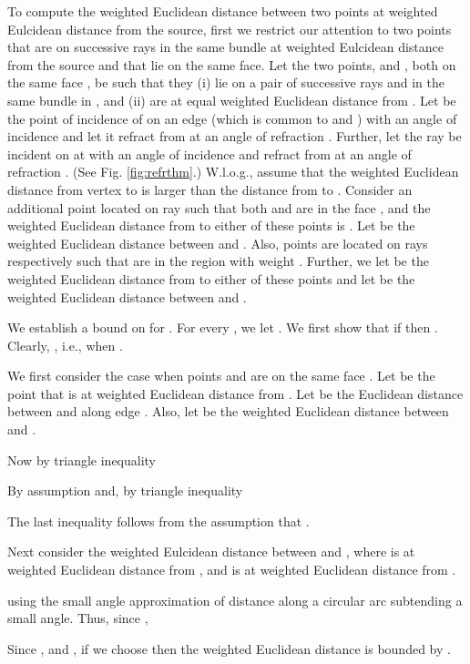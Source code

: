 \documentclass[11pt]{article}
\newenvironment{proof}{\par\noindent{\bf Proof:}}{\mbox{}\hfill\\}
\begin{document}
\begin{proof}
To compute the weighted Euclidean distance between two points at weighted Eulcidean distance  from the source, first we restrict our attention to two points that are on successive rays in the same bundle at weighted Eulcidean distance  from the source and that lie on the same face. 
Let the two points,  and , both on the same face , be such that they
(i) lie on a pair of successive rays  and  in the same bundle in , and (ii) are at equal weighted Euclidean distance from  .
Let  be the point of incidence of  on an edge  (which is common to  and ) with an angle of incidence  and let it refract from  at an angle of refraction . 
Further, let the ray  be incident on  at  with an angle of incidence  and refract from  at an angle of refraction . 
(See Fig. \ref{fig:refrthm}.)
W.l.o.g., assume that the weighted Euclidean distance from vertex  to  is larger than the distance from  to . 
Consider an additional point  located on ray  such that both  and  are in the face , and the weighted Euclidean distance from  to either of these points is . 
Let  be the weighted Euclidean distance between  and .
Also, points  are located on rays  respectively such that  are in the region  with weight .
Further, we let  be the weighted Euclidean distance from  to either of these points and let  be the weighted Euclidean distance between  and .

We establish a bound on  for .
For every , we let .
We first show that if  then . 
Clearly, , i.e., when .

We first consider the case when points  and  are on the same face .
Let  be the point that is at weighted Euclidean distance  from .
Let  be the Euclidean distance between  and  along edge .
Also, let  be the weighted Euclidean distance between  and .

Now by triangle inequality

By assumption  and, by triangle inequality

The last inequality follows from the assumption that .

Next consider the weighted Eulcidean distance between  and , where  is at weighted Euclidean distance  from , and  is at weighted Euclidean distance  from .

using the small angle approximation of distance along a circular arc subtending a small angle.
Thus, since ,

Since ,  and , if we choose  then the weighted Euclidean distance  is bounded by .
\end{proof}
\end{document}
